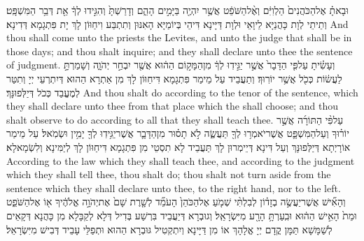 {וּבָאתָ֗ אֶל\maqqaf הַכֹּהֲנִים֙ הַלְוִיִּ֔ם וְאֶ֨ל\maqqaf הַשֹּׁפֵ֔ט אֲשֶׁ֥ר יִהְיֶ֖ה בַּיָּמִ֣ים הָהֵ֑ם וְדָרַשְׁתָּ֙ וְהִגִּ֣ידוּ לְךָ֔ אֵ֖ת דְּבַ֥ר הַמִּשְׁפָּֽט׃}
{וְתֵיתֵי לְוָת כָּהֲנַיָּא לֵיוָאֵי וּלְוָת דַּיָּינָא דִּיהֵי בְּיוֹמַיָּא הָאִנּוּן וְתִתְבַּע וִיחַוּוֹן לָךְ יָת פִּתְגָמָא דְּדִינָא׃}
{And thou shall come unto the priests the Levites, and unto the judge that shall be in those days; and thou shalt inquire; and they shall declare unto thee the sentence of judgment.}{}
{וְעָשִׂ֗יתָ עַל\maqqaf פִּ֤י הַדָּבָר֙ אֲשֶׁ֣ר יַגִּ֣ידֽוּ לְךָ֔ מִן\maqqaf הַמָּק֣וֹם הַה֔וּא אֲשֶׁ֖ר יִבְחַ֣ר יְהֹוָ֑ה וְשָׁמַרְתָּ֣ לַעֲשׂ֔וֹת כְּכֹ֖ל אֲשֶׁ֥ר יוֹרֽוּךָ׃}
{וְתַעֲבֵיד עַל מֵימַר פִּתְגָמָא דִּיחַוּוֹן לָךְ מִן אַתְרָא הַהוּא דְּיִתְרְעֵי יְיָ וְתִטַּר לְמֶעֱבַד כְּכֹל דְּיַלְּפוּנָּךְ׃}
{And thou shalt do according to the tenor of the sentence, which they shall declare unto thee from that place which the \lord\space shall choose; and thou shalt observe to do according to all that they shall teach thee.}{}
{עַל\maqqaf פִּ֨י הַתּוֹרָ֜ה אֲשֶׁ֣ר יוֹר֗וּךָ וְעַל\maqqaf הַמִּשְׁפָּ֛ט אֲשֶׁר\maqqaf יֹאמְר֥וּ לְךָ֖ תַּעֲשֶׂ֑ה לֹ֣א תָס֗וּר מִן\maqqaf הַדָּבָ֛ר אֲשֶׁר\maqqaf יַגִּ֥ידֽוּ לְךָ֖ יָמִ֥ין וּשְׂמֹֽאל׃}
{עַל מֵימַר אוֹרָיְתָא דְּיַלְּפוּנָּךְ וְעַל דִּינָא דְּיֵימְרוּן לָךְ תַּעֲבֵיד לָא תִסְטֵי מִן פִּתְגָמָא דִּיחַוּוֹן לָךְ לְיַמִּינָא וְלִשְׂמָאלָא׃}
{According to the law which they shall teach thee, and according to the judgment which they shall tell thee, thou shalt do; thou shalt not turn aside from the sentence which they shall declare unto thee, to the right hand, nor to the left.}{}
{וְהָאִ֞ישׁ אֲשֶׁר\maqqaf יַעֲשֶׂ֣ה בְזָד֗וֹן לְבִלְתִּ֨י שְׁמֹ֤עַ אֶל\maqqaf הַכֹּהֵן֙ הָעֹמֵ֞ד לְשָׁ֤רֶת שָׁם֙ אֶת\maqqaf יְהֹוָ֣ה אֱלֹהֶ֔יךָ א֖וֹ אֶל\maqqaf הַשֹּׁפֵ֑ט וּמֵת֙ הָאִ֣ישׁ הַה֔וּא וּבִֽעַרְתָּ֥ הָרָ֖ע מִיִּשְׂרָאֵֽל׃}
{וְגוּבְרָא דְּיַעֲבֵיד בִּרְשַׁע בְּדִיל דְּלָא לְקַבָּלָא מִן כָּהֲנָא דְּקָאֵים לְשַׁמָּשָׁא תַּמָּן קֳדָם יְיָ אֱלָהָךְ אוֹ מִן דַּיָּינָא וְיִתְקְטִיל גּוּבְרָא הַהוּא וּתְפַלֵּי עָבֵיד דְּבִישׁ מִיִּשְׂרָאֵל׃}
